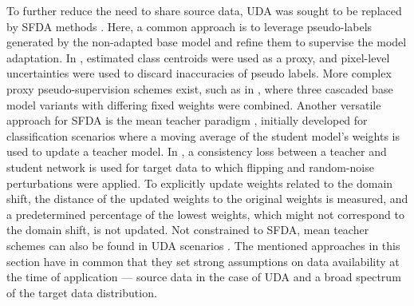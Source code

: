     To further reduce the need to share source data, UDA was sought to be replaced by SFDA methods \cite{yang2022source,wen2023source,chen2021source}.
    Here, a common approach is to leverage pseudo-labels generated by the non-adapted base model and refine them to supervise the model adaptation. In \cite{chen2021source}, estimated class centroids were used as a proxy, and pixel-level uncertainties were used to discard inaccuracies of pseudo labels.
    More complex proxy pseudo-supervision schemes exist, such as in \cite{yang2022source}, where three cascaded base model variants with differing fixed weights were combined.
    Another versatile approach for SFDA is the mean teacher paradigm \cite{tarvainen2017mean}, initially developed for classification scenarios where a moving average of the student model’s weights is used to update a teacher model. In \cite{wen2023source}, a consistency loss between a teacher and student network is used for target data to which flipping and random-noise perturbations were applied. To explicitly update weights related to the domain shift, the distance of the updated weights to the original weights is measured, and a predetermined percentage of the lowest weights, which might not correspond to the domain shift, is not updated. Not constrained to SFDA, mean teacher schemes can also be found in UDA scenarios \cite{perone2019unsupervised}.
    The mentioned approaches in this section have in common that they set strong assumptions on data availability at the time of application --- source data in the case of UDA and a broad spectrum of the target data distribution.
